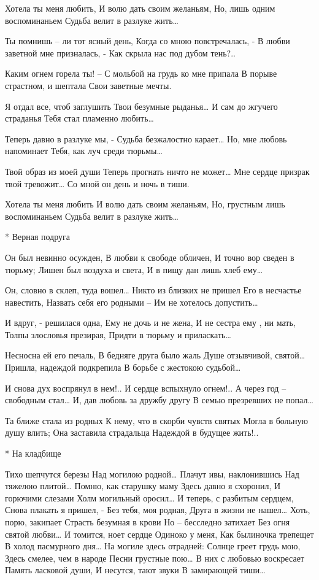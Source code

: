 Хотела ты меня любить,
И волю дать своим желаньям,
Но, лишь одним воспоминаньем
Судьба велит в разлуке жить…

Ты помнишь – ли тот ясный день,
Когда со мною повстречалась, -
В любви заветной мне призналась, -
Как скрыла нас под дубом тень?..

Каким огнем горела ты! –
С мольбой на грудь ко мне припала
В порыве страстном, и шептала
Свои заветные мечты.

Я отдал все, чтоб заглушить
Твои безумные рыданья…
И сам до жгучего страданья
Тебя стал пламенно любить…

Теперь давно в разлуке мы, -
Судьба безжалостно карает…
Но, мне любовь напоминает
Тебя, как луч среди тюрьмы…

Твой образ из моей души
Теперь прогнать ничто не может…
Мне сердце призрак твой тревожит…
Со мной он день и ночь в тиши.

Хотела ты меня любить
И волю дать своим желаньям,
Но, грустным лишь воспоминаньем
Судьба велит в разлуке жить…


* Верная подруга

Он был невинно осужден,
В любви к свободе обличен,
И точно вор сведен в тюрьму;
Лишен был воздуха и света,
И в пищу дан лишь хлеб ему…

Он, словно в склеп, туда вошел…
Никто из близких не пришел
Его в несчастье навестить,
Назвать себя его родными –
Им не хотелось допустить…

И вдруг, - решилася одна,
Ему не дочь и не жена,
И не сестра ему , ни мать,
Толпы злословья презирая,
Придти в тюрьму и приласкать…

Несносна ей его печаль,
В бедняге друга было жаль
Душе отзывчивой, святой…
Пришла, надеждой подкрепила
В борьбе с жестокою судьбой…

И снова дух воспрянул в нем!..
И сердце вспыхнуло огнем!..
А через год – свободным стал…
И, дав любовь за дружбу другу
В семью презревших не попал…

Та ближе стала из родных
К нему, что в скорби чувств святых
Могла в больную душу влить;
Она заставила страдальца
Надеждой в будущее жить!..


* На кладбище

Тихо шепчутся березы
Над могилою родной…
Плачут ивы, наклонившись
Над тяжелою плитой…
Помню, как старушку маму
Здесь давно я схоронил,
И горючими слезами
Холм могильный оросил…
И теперь, с разбитым сердцем,
Снова плакать я пришел, -
Без тебя, моя родная,
Друга в жизни не нашел…
Хоть, порю, закипает
Страсть безумная в крови
Но – бесследно затихает
Без огня святой любви…
И томится, ноет сердце
Одиноко у меня,
Как былиночка трепещет
В холод пасмурного дня…
На могиле здесь отрадней:
Солнце греет грудь мою,
Здесь смелее, чем в народе
Песни грустные пою…
В них с любовью воскресает
Память ласковой души,
И несутся, тают звуки
В замирающей тиши…


